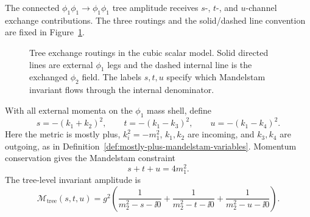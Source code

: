The connected \(\phi_1\phi_1\to\phi_1\phi_1\) tree amplitude receives
\(s\)-, \(t\)-, and \(u\)-channel exchange contributions.  The three routings
and the solid/dashed line convention are fixed in
Figure~\ref{fig:exchange-model-stu-tree-routings}.
\begin{figure}[!ht]
\centering
{}
\caption{Tree exchange routings in the cubic scalar model.  Solid directed
lines are external \(\phi_1\) legs and the dashed internal line is the exchanged
\(\phi_2\) field.  The labels \(s,t,u\) specify which Mandelstam invariant flows
through the internal denominator.}
\label{fig:exchange-model-stu-tree-routings}
\end{figure}
With all external momenta on the \(\phi_1\) mass shell, define
\[
  s=-(k_1+k_2)^2,\qquad
  t=-(k_1-k_3)^2,\qquad
  u=-(k_1-k_4)^2 .
\]
Here the metric is mostly plus, \(k_i^2=-m_1^2\), \(k_1,k_2\) are incoming,
and \(k_3,k_4\) are outgoing, as in
Definition~\ref{def:mostly-plus-mandelstam-variables}.  Momentum conservation
gives the Mandelstam constraint
\[
  s+t+u=4m_1^2 .
\]
The tree-level invariant amplitude is
\[
  \mathcal M_{\mathrm{tree}}(s,t,u)
  =
  g^2
  \left(
    \frac{1}{m_2^2-s-\ii0}
    +
    \frac{1}{m_2^2-t-\ii0}
    +
    \frac{1}{m_2^2-u-\ii0}
  \right).
\]

